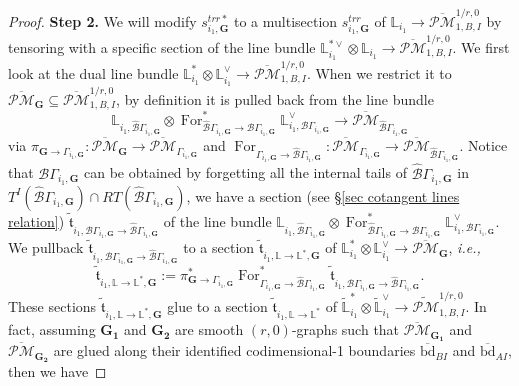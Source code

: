 \documentclass[11pt]{amsart}
\theoremstyle{definition}
\theoremstyle{remark}
\newcommand{\oPMb}{{\overline{\mathcal{PM}}}}
\newcommand{\nontilde}{}
\newcommand{\<}{\left<}
\renewcommand{\>}{\right>}
\numberwithin{equation}{section}
\begin{document}
\begin{proof}
    \noindent \textbf{Step 2.}
        We will modify $\nontilde{s}^{trr*}_{i_1,\mathbf{G}}$ to a  multisection $\nontilde{s}^{trr}_{i_1,\mathbf{G}}$  of $\mathbb L_{i_1}\to \oPMb^{1/r,0}_{1,B,I}$ by tensoring with a specific section of the line bundle $\mathbb L_{i_1}^{*\vee}\otimes \mathbb L_{i_1} \to \oPMb^{1/r,0}_{1,B,I}$.
         We first look at the dual line bundle $\mathbb L_{i_1}^*\otimes \mathbb L_{i_1}^\vee \to \oPMb^{1/r,0}_{1,B,I}$. When we restrict it to $\oPMb_{\mathbf{G}}\subseteq \oPMb^{1/r,0}_{1,B,I}$, by definition it is pulled back from the line bundle 
        $$\mathbb L_{i_1,\hat{\mathcal B}\Gamma_{i_1,\bm{G}}}\otimes \operatorname{For}^*_{\hat{\mathcal B}\Gamma_{i_1,\bm{G}}\to {\mathcal B}\Gamma_{i_1,\bm{G}}}\mathbb L_{i_1,{\mathcal B}\Gamma_{i_1,\bm{G}}}^\vee\to \oPMb_{\hat{\mathcal B}\Gamma_{i_1,\bm{G}}} $$ via $\pi_{\mathbf{G}\to \Gamma_{i_1,\mathbf{G}}}\colon \oPMb_{\mathbf{G}}\to \oPMb_{\Gamma_{i_1,\mathbf{G}}}$ 
        and        $\operatorname{For}_{\Gamma_{i_1,\bm{G}}\to\hat{\mathcal B}\Gamma_{i_1,\bm{G}}}\colon \oPMb_{\Gamma_{i_1,\bm{G}}}\to \oPMb_{\hat{\mathcal B}\Gamma_{i_1,\bm{G}}}$.  
        Notice that ${\mathcal B}\Gamma_{i_1,\bm{G}}$ can be obtained by forgetting all the internal tails of $\hat{\mathcal B}\Gamma_{i_1,\bm{G}}$ in $T^I(\hat{\mathcal B}\Gamma_{i_1,\bm{G}})\cap RT(\hat{\mathcal B}\Gamma_{i_1,\bm{G}})$, we have a section (see \S \ref{sec cotangent lines relation}) $\tilde{\mathfrak t}_{i_1,{\mathcal B}\Gamma_{i_1,\bm{G}}\to\hat{\mathcal B}\Gamma_{i_1,\bm{G}}}$ of the line bundle $\mathbb L_{i_1,\hat{\mathcal B}\Gamma_{i_1,\bm{G}}}\otimes \operatorname{For}^*_{\hat{\mathcal B}\Gamma_{i_1,\bm{G}}\to {\mathcal B}\Gamma_{i_1,\bm{G}}}\mathbb L_{i_1,{\mathcal B}\Gamma_{i_1,\bm{G}}}^\vee$. We pullback $\tilde{\mathfrak t}_{i_1,{\mathcal B}\Gamma_{i_1,\bm{G}}\to\hat{\mathcal B}\Gamma_{i_1,\bm{G}}}$  to a section $\tilde{\mathfrak{t}}_{i_1,\mathbb L \to \mathbb L^*,\mathbf{G}}$ of $\mathbb L_{i_1}^*\otimes \mathbb L_{i_1}^\vee \to \oPMb_{\mathbf{G}}$, \textit{i.e.,}
        $$
        \tilde{\mathfrak{t}}_{i_1,\mathbb L \to \mathbb L^*,\mathbf{G}}:=\pi^*_{\mathbf{G}\to \Gamma_{i_1,\mathbf{G}}}\operatorname{For}^*_{\Gamma_{i_1,\bm{G}}\to\hat{\mathcal B}\Gamma_{i_1,\bm{G}}}\tilde{\mathfrak t}_{i_1,{\mathcal B}\Gamma_{i_1,\bm{G}}\to\hat{\mathcal B}\Gamma_{i_1,\bm{G}}}.
        $$
        These sections $\tilde{\mathfrak{t}}_{i_1,\mathbb L \to \mathbb L^*,\mathbf{G}}$ glue to a section $\tilde{\mathfrak{t}}_{i_1,\mathbb L \to \mathbb L^*}$ of $\widetilde{\mathbb L}^*_{i_1}\otimes \widetilde{\mathbb L}_{i_1}^\vee\to \widetilde{\mathcal{PM}}^{1/r,0}_{1,B,I}$. In fact, assuming $\mathbf{G_1}$ and $\mathbf{G_2}$ are smooth $(r,0)$-graphs such that $\oPMb_{\mathbf{G_1}}$ and $\oPMb_{\mathbf{G_2}}$ are glued along their identified codimensional-1 boundaries $\overline{\text{bd}}_{BI}$ and $\overline{\text{bd}}_{AI}$, then we have 

\end{proof}
\end{document}
